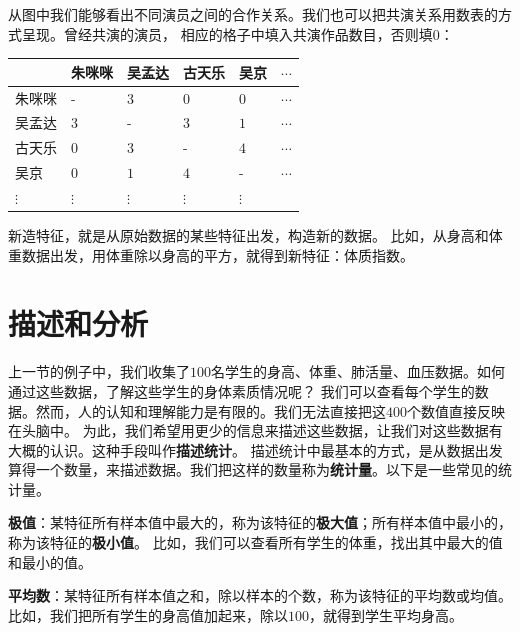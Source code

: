 \documentclass[12pt,UTF8,fontset=none]{ctexbook}
\begin{document}
从图中我们能够看出不同演员之间的合作关系。我们也可以把共演关系用数表的方式呈现。曾经共演的演员，
相应的格子中填入共演作品数目，否则填$0$：
\begin{center}
    \begin{tabular}{ | p{3.2em}<{\centering} | p{3.2em}<{\centering} | p{3.2em}<{\centering} | p{3.2em}<{\centering} | p{3.2em}<{\centering} | p{2em}<{\centering} | }
        \hline
           & 朱咪咪 & 吴孟达 & 古天乐 & 吴京 & $\cdots$ \\ [0.5ex]
        \hline
        朱咪咪 & - & $3$ & $0$ & $0$ & $\cdots$ \\  
        \hline
        吴孟达 & $3$ & - & $3$ & $1$ & $\cdots$ \\  
        \hline
        古天乐 & $0$ & $3$ & - & $4$ & $\cdots$ \\ 
        \hline
        吴京 & $0$ & $1$ & $4$ & - & $\cdots$ \\ 
        \hline
        $\vdots$ & $\vdots$ & $\vdots$ & $\vdots$ & $\vdots$ &  \\  
        \hline
    \end{tabular}
\end{center}

新造特征，就是从原始数据的某些特征出发，构造新的数据。
比如，从身高和体重数据出发，用体重除以身高的平方，就得到新特征：体质指数。


\section{描述和分析}
上一节的例子中，我们收集了$100$名学生的身高、体重、肺活量、血压数据。如何通过这些数据，了解这些学生的身体素质情况呢？
我们可以查看每个学生的数据。然而，人的认知和理解能力是有限的。我们无法直接把这$400$个数值直接反映在头脑中。
为此，我们希望用更少的信息来描述这些数据，让我们对这些数据有大概的认识。这种手段叫作\textbf{描述统计}。
描述统计中最基本的方式，是从数据出发算得一个数量，来描述数据。我们把这样的数量称为\textbf{统计量}。以下是一些常见的统计量。

\textbf{极值}：某特征所有样本值中最大的，称为该特征的\textbf{极大值}；所有样本值中最小的，称为该特征的\textbf{极小值}。
比如，我们可以查看所有学生的体重，找出其中最大的值和最小的值。

\textbf{平均数}：某特征所有样本值之和，除以样本的个数，称为该特征的平均数或均值。
比如，我们把所有学生的身高值加起来，除以$100$，就得到学生平均身高。
\end{document}
